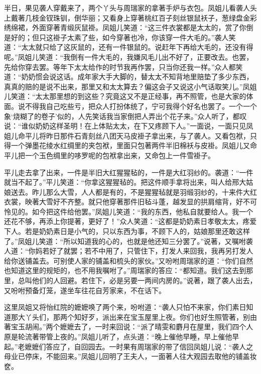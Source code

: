 \begin{parag}
    半日，果见袭人穿戴来了，两个丫头与周瑞家的拿著手炉与衣包。凤姐儿看袭人头上戴著几枝金钗珠钏，倒华丽；又看身上穿著桃红百子刻丝银鼠袄子，葱绿盘金彩绣绵裙，外面穿著青缎灰鼠褂。凤姐儿笑道：“这三件衣裳都是太太的，赏了你倒是好的；但只这褂子太素了些，如今穿著也冷，你该穿一件大毛的。”袭人笑道：“太太就只给了这灰鼠的，还有一件银鼠的。说赶年下再给大毛的，还没有得呢。”凤姐儿笑道：“我倒有一件大毛的，我嫌风毛儿出不好了，正要改去。也罢，先给你穿去罢。等年下太太给作的时节我再作罢，只当你还我一样。”众人都笑道：“奶奶惯会说这话。成年家大手大脚的，替太太不知背地里赔垫了多少东西，真真的赔的是说不出来，那里又和太太算去？偏这会子又说这小气话取笑儿。”凤姐儿笑道：“太太那里想的到这些？究竟这又不是正经事，再不照管，也是大家的体面。说不得我自己吃些亏，把众人打扮体统了，宁可我得个好名也罢了。一个一个象‘烧糊了的卷子’似的，人先笑话我当家倒把人弄出个花子来。”众人听了，都叹说：“谁似奶奶这样圣明！在上体贴太太，在下又疼顾下人。”一面说，一面只见凤姐儿命平儿将昨日那件石青刻丝八团天马皮褂子拿出来，与了袭人。又看包袱，只得一个弹墨花绫水红绸里的夹包袱，里面只包著两件半旧棉袄与皮褂。凤姐儿又命平儿把一个玉色绸里的哆罗呢的包袱拿出来，又命包上一件雪褂子。
\end{parag}


\begin{parag}
    平儿走去拿了出来，一件是半旧大红猩猩毡的，一件是大红羽纱的。袭道：“一件就当不起了。”平儿笑道：“你拿这猩猩毡的。把这件顺手拿将出来，叫人给邢大姑娘送去。昨儿那么大雪，人人都是有的，不是猩猩毡就是羽缎羽纱的，十来件大红衣裳，映著大雪好不齐整。就只他穿著那件旧毡斗蓬，越发显的拱肩缩背，好不可怜见的。如今把这件给他罢。”凤姐儿笑道：“我的东西，他私自就要给人。我一个还花不够，再添上你提著，更好了！”众人笑道：“这都是奶奶素日孝敬太太，疼爱下人。若是奶奶素日是小气的，只以东西为事，不顾下人的，姑娘那里还敢这样了。”凤姐儿笑道：“所以知道我的心的，也就是他还知三分罢了。”说著，又嘱咐袭人道：“你妈若好了就罢；若不中用了，只管住下，打发人来回我，我再另打发人给你送铺盖去。可别使人家的铺盖和梳头的家伙。”又吩咐周瑞家的道：“你们自然也知道这里的规矩的，也不用我嘱咐了。”周瑞家的答应：“都知道。我们这去到那里，总叫他们的人回避。若住下，必是另要一两间内房的。”说著，跟了袭人出去，又吩咐预备灯笼，遂坐车往花自芳家来，不在话下。
\end{parag}


\begin{parag}
    这里凤姐又将怡红院的嬷嬷唤了两个来，吩咐道：“袭人只怕不来家，你们素日知道那大丫头们，那两个知好歹，派出来在宝玉屋里上夜。你们也好生照管著，别由著宝玉胡闹。”两个嬷嬷去了，一时来回说：“派了晴雯和麝月在屋里，我们四个人原是轮流著带管上夜的。”凤姐儿听了，点头道：“晚上催他早睡，早上催他早起。”老嬷嬷们答应了，自回园去。一时果有周瑞家的带了信回凤姐儿说：“袭人之母业已停床，不能回来。”凤姐儿回明了王夫人，一面著人往大观园去取他的铺盖妆奁。
\end{parag}


